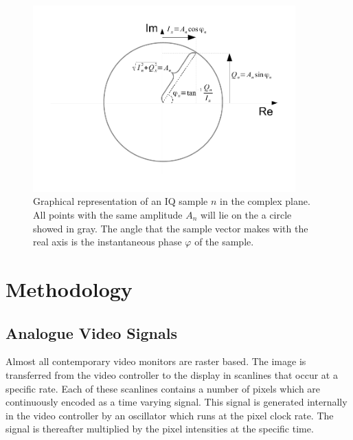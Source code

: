 \documentclass[a4paper,12pt,twoside,openright]{report}
\begin{document}
\begin{figure}
\centering
\includegraphics[width=0.9\textwidth]{iqdrawing}
  \caption{Graphical representation of an IQ sample $n$ in the complex plane. All points with the same amplitude $A_{n}$ will lie on the a circle showed in gray. The angle that the sample vector makes with the real axis is the instantaneous phase $\varphi$ of the sample.}
  \label{fig:IQ}
\end{figure}

\chapter{Methodology} 

\section{Analogue Video Signals}

Almost all contemporary video monitors are raster based. The image is transferred from the video controller to the display in scanlines that occur at a specific rate. Each of these scanlines contains a number of pixels which are continuously encoded as a time varying signal. This signal is generated internally in the video controller by an oscillator which runs at the pixel clock rate. The signal is thereafter multiplied by the pixel intensities at the specific time.
\end{document}
